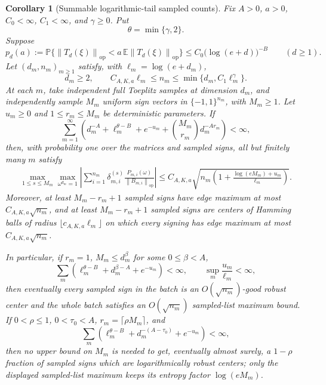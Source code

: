 \documentclass[11pt]{amsart}
\numberwithin{equation}{section}
\newtheorem{corollary}[theorem]{Corollary}
\theoremstyle{definition}
\theoremstyle{remark}
\newcommand{\op}{\mathrm{op}}
\newcommand{\Prob}{\mathbb P}
\newcommand{\Exp}{\mathbb E}
\newcommand{\norm}[1]{\left\lVert #1\right\rVert}
\begin{document}
\begin{corollary}[Summable logarithmic-tail sampled counts]
\label{cor:normalizer-tail-borel-log-summable-counts}
Fix \(A>0\), \(a>0\), \(C_0<\infty\), \(C_1<\infty\), and \(\gamma\ge0\).  Put
\[
  \theta=\min\{\gamma,2\}.
\]
Suppose
\[
  p_d(a):=\Prob\{\norm{T_d(\xi)}_{\op}<a\,\Exp\norm{T_d(\xi)}_{\op}\}
  \le C_0\bigl(\log(e+d)\bigr)^{-B}
  \qquad(d\ge1).
\]
Let \((d_m,n_m)_{m\ge1}\) satisfy, with \(\ell_m=\log(e+d_m)\),
\[
  d_m\ge2,\qquad
  C_{A,K,a}\ell_m\le n_m\le \min\{d_m,C_1\ell_m^\gamma\}.
\]
At each \(m\), take independent full Toeplitz samples at dimension \(d_m\), and
independently sample \(M_m\) uniform sign vectors in \(\{-1,1\}^{n_m}\), with
\(M_m\ge1\).  Let \(u_m\ge0\) and \(1\le r_m\le M_m\) be deterministic
parameters.  If
\[
  \sum_{m=1}^{\infty}
  \left(
    d_m^{-A}+\ell_m^{\theta-B}
    +e^{-u_m}+\binom{M_m}{r_m}d_m^{-A r_m}
  \right)<\infty,
\]
then, with probability one over the matrices and sampled signs, all but
finitely many \(m\) satisfy
\[
\begin{aligned}
  \max_{1\le s\le M_m}\max_{\omega^{d_m}=1}
  \left|\sum_{i=1}^{n_m}\delta_{m,i}^{(s)}
  \frac{P_{m,i}(\omega)}{\norm{B_{m,i}}_{\op}}\right|
  \le
  C_{A,K,a}\sqrt{
    n_m\left(1+\frac{\log(eM_m)+u_m}{\ell_m}\right)} .
\end{aligned}
\]
Moreover, at least \(M_m-r_m+1\) sampled signs have edge maximum at most
\(C_{A,K,a}\sqrt{n_m}\), and at least \(M_m-r_m+1\) sampled signs are centers of
Hamming balls of radius \(\lfloor c_{A,K,a}\ell_m\rfloor\) on which every
signing has edge maximum at most \(C_{A,K,a}\sqrt{n_m}\).

In particular, if \(r_m=1\), \(M_m\le d_m^\beta\) for some \(0\le\beta<A\),
\[
  \sum_m\left(\ell_m^{\theta-B}+d_m^{\beta-A}+e^{-u_m}\right)<\infty,
  \qquad
  \sup_m\frac{u_m}{\ell_m}<\infty,
\]
then eventually every sampled sign in the batch is an \(O(\sqrt{n_m})\)-good
robust center and the whole batch satisfies an \(O(\sqrt{n_m})\) sampled-list
maximum bound.  If \(0<\rho\le1\), \(0<\tau_0<A\),
\(r_m=\lceil\rho M_m\rceil\), and
\[
  \sum_m\left(\ell_m^{\theta-B}+d_m^{-(A-\tau_0)}+e^{-u_m}\right)<\infty,
\]
then no upper bound on \(M_m\) is needed to get, eventually almost surely, a
\(1-\rho\) fraction of sampled signs which are logarithmically robust centers;
only the displayed sampled-list maximum keeps its entropy factor
\(\log(eM_m)\).
\end{corollary}
\end{document}
